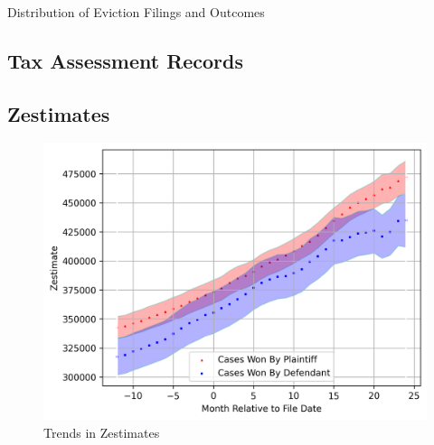 \documentclass[12pt]{article}
\begin{document}
        \begin{table}[H]
            \centering
            
            \caption{Distribution of Eviction Filings and Outcomes}
            \label{tab:my_label}
        \end{table}
    
    \subsection{Tax Assessment Records}
    \subsection{Zestimates}
        \begin{figure}[H]
            \centering
            \includegraphics{output/summary_statistics/figures/trends_in_zestimates.png}
            \caption{Trends in Zestimates}
            \label{fig:my_label}
        \end{figure}
\end{document}
